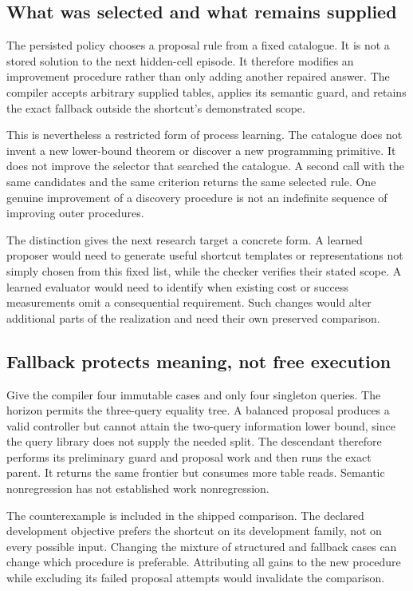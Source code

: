 \subsection{What was selected and what remains supplied}
The persisted policy chooses a proposal rule from a fixed catalogue. It is not a stored solution to the next hidden-cell episode. It therefore modifies an improvement procedure rather than only adding another repaired answer. The compiler accepts arbitrary supplied tables, applies its semantic guard, and retains the exact fallback outside the shortcut's demonstrated scope.

This is nevertheless a restricted form of process learning. The catalogue does not invent a new lower-bound theorem or discover a new programming primitive. It does not improve the selector that searched the catalogue. A second call with the same candidates and the same criterion returns the same selected rule. One genuine improvement of a discovery procedure is not an indefinite sequence of improving outer procedures.

The distinction gives the next research target a concrete form. A learned proposer would need to generate useful shortcut templates or representations not simply chosen from this fixed list, while the checker verifies their stated scope. A learned evaluator would need to identify when existing cost or success measurements omit a consequential requirement. Such changes would alter additional parts of the realization and need their own preserved comparison.

\subsection{Fallback protects meaning, not free execution}
\begin{SIIcounterexample}\label{SII:ex:slow-fallback}
Give the compiler four immutable cases and only four singleton queries. The horizon permits the three-query equality tree. A balanced proposal produces a valid controller but cannot attain the two-query information lower bound, since the query library does not supply the needed split. The descendant therefore performs its preliminary guard and proposal work and then runs the exact parent. It returns the same frontier but consumes more table reads. Semantic nonregression has not established work nonregression.
\end{SIIcounterexample}

The counterexample is included in the shipped comparison. The declared development objective prefers the shortcut on its development family, not on every possible input. Changing the mixture of structured and fallback cases can change which procedure is preferable. Attributing all gains to the new procedure while excluding its failed proposal attempts would invalidate the comparison.

